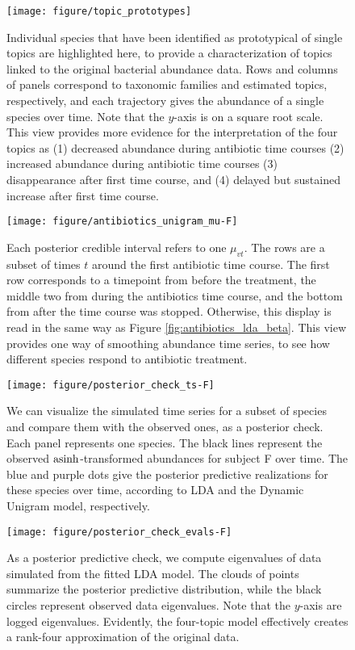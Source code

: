 \documentclass[oupdraft]{bio}
\begin{document}
{\begin{figure}[!p]
  \centering\texttt{[image: figure/topic\_prototypes]}
  \caption{Individual species that have been identified as prototypical of
    single topics are highlighted here, to provide a characterization of topics
    linked to the original bacterial abundance data. Rows and columns of panels
    correspond to taxonomic families and estimated topics,
    respectively, and each trajectory gives the abundance of a single species
    over time. Note that the $y$-axis is on a square root scale. This view
    provides more evidence for the interpretation of the four topics as (1)
    decreased abundance during antibiotic time courses (2) increased abundance during
    antibiotic time courses (3) disappearance after first time course, and (4)
    delayed but sustained increase after first time
    course. \label{fig:topic_prototypes}}
\end{figure}

\begin{figure}[!p]
  \centering
  \texttt{[image: figure/antibiotics\_unigram\_mu-F]}
  \caption{Each posterior credible interval refers to one $\mu_{vt}$. The rows
    are a subset of times $t$ around the first antibiotic time course. The first
    row corresponds to a timepoint from before the treatment, the middle two
    from during the antibiotics time course, and the bottom from after the time
    course was stopped. Otherwise, this display is read in the same way as
    Figure \ref{fig:antibiotics_lda_beta}. This view provides one way of
    smoothing abundance time series, to see how different species respond to
    antibiotic treatment. \label{fig:antibiotics_unigram_theta} }
\end{figure}

\begin{figure}[!p]
  \centering
  \texttt{[image: figure/posterior\_check\_ts-F]}
  \caption{We can visualize the simulated time series for a subset of species
    and compare them with the observed ones, as a posterior check. Each panel
    represents one species. The black lines represent the observed
    $\mathop\mathrm{asinh}$-transformed abundances for subject F over time. The blue and purple
    dots give the posterior predictive realizations for these species over time,
    according to LDA and the Dynamic Unigram model, respectively.
    \label{fig:antibiotics_posterior_ts}}
\end{figure}

\begin{figure}[!p]
  \centering
  \texttt{[image: figure/posterior\_check\_evals-F]}
  \caption{As a posterior predictive check, we compute eigenvalues of data
    simulated from the fitted LDA model. The clouds of points summarize the
    posterior predictive distribution, while the black circles represent
    observed data eigenvalues. Note that the $y$-axis are logged eigenvalues.
    Evidently, the four-topic model effectively creates a rank-four
    approximation of the original data. \label{fig:antibiotics_posterior_evals}}
\end{figure}


}
\end{document}
